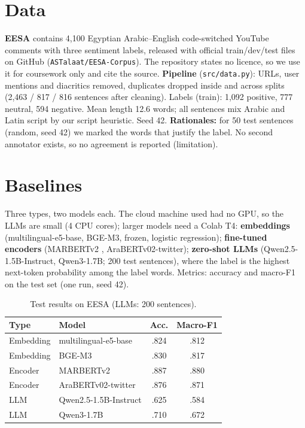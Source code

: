 \documentclass[11pt]{article}
\begin{document}
\section{Data}
\textbf{EESA} \citep{sherif2024eesa} contains 4,100 Egyptian Arabic--English code-switched YouTube comments with
three sentiment labels, released with official train/dev/test files on GitHub
(\texttt{ASTalaat/\allowbreak EESA-Corpus}). The repository states no licence, so we use it for coursework only and cite the source.
\textbf{Pipeline} (\texttt{src/data.py}): URLs, user mentions and diacritics removed, duplicates dropped inside and across splits
(2,463 / 817 / 816 sentences after cleaning). Labels (train): 1,092 positive, 777 neutral, 594 negative. Mean length 12.6 words;
all sentences mix Arabic and Latin script by our script heuristic. Seed 42.
\textbf{Rationales:} for 50 test sentences (random, seed 42) we marked the words that justify the label.
No second annotator
exists, so no agreement is reported (limitation).

\section{Baselines}
Three types, two models each. The cloud machine used had no GPU, so the LLMs are small (4 CPU cores); larger models need a Colab T4:
\textbf{embeddings} (multilingual-e5-base, BGE-M3, frozen, logistic regression);
\textbf{fine-tuned encoders} (MARBERTv2 \citep{abdulmageed2021arbert}, AraBERTv02-twitter);
\textbf{zero-shot LLMs} (Qwen2.5-1.5B-Instruct, Qwen3-1.7B; 200 test sentences), where the label is the
highest next-token probability among the label words. Metrics: accuracy and macro-F1 on the test set (one run, seed 42).

\begin{table}[h]\centering\small
\begin{tabular}{llcc}\toprule
Type & Model & Acc. & Macro-F1\\\midrule
Embedding & multilingual-e5-base & .824 & .812\\
Embedding & BGE-M3 & .830 & .817\\
Encoder & MARBERTv2 & .887 & .880\\
Encoder & AraBERTv02-twitter & .876 & .871\\
LLM & Qwen2.5-1.5B-Instruct & .625 & .584\\
LLM & Qwen3-1.7B & .710 & .672\\\bottomrule
\end{tabular}\caption{Test results on EESA (LLMs: 200 sentences).}
\end{table}
\end{document}
